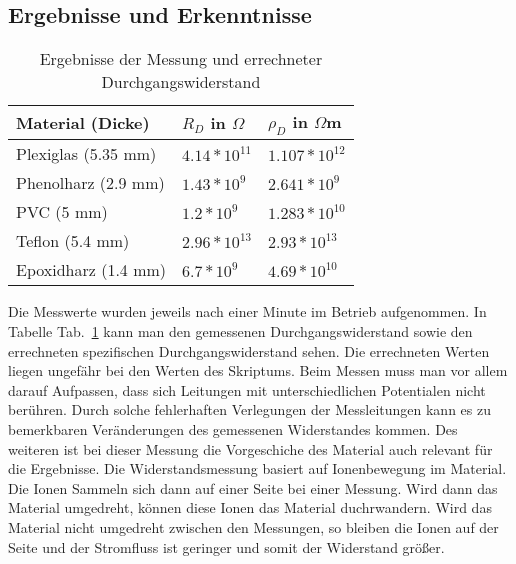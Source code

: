 \documentclass[a4paper,twoside,12pt,DIV=13,BCOR=5mm,numbers=noenddot,cleardoublepage=empty]{scrbook}
\begin{document}
            \subsection{Ergebnisse und Erkenntnisse}
            \begin{table}[h]
                \begin{center}
                    \begin{tabular}{|l||l|l|}
                        \hline
                        Material (Dicke) & $R_D$ in $\Omega$ & $\rho_D$ in $\Omega$m \\
                        \hline
                        \hline
                        Plexiglas (5.35 mm) & $4.14*10^{11}$ & $1.107*10^{12}$ \\
                        \hline
                        Phenolharz (2.9 mm) & $1.43*10^{9}$ & $2.641*10^{9}$ \\
                        \hline
                        PVC (5 mm) & $1.2*10^{9}$ & $1.283*10^{10}$ \\
                        \hline
                        Teflon (5.4 mm) & $2.96*10^{13}$ & $2.93*10^{13}$ \\
                        \hline
                        Epoxidharz (1.4 mm) & $6.7*10^{9}$ & $4.69*10^{10}$ \\
                        \hline
                    \end{tabular}
                    \caption{Ergebnisse der Messung und errechneter Durchgangswiderstand}
                    \label{tab:table1}
                \end{center}
            \end{table}
            Die Messwerte wurden jeweils nach einer Minute im Betrieb aufgenommen. In Tabelle
            Tab.~\ref{tab:table1} kann man den gemessenen Durchgangswiderstand sowie den errechneten spezifischen
            Durchgangswiderstand sehen. Die errechneten Werten liegen ungefähr bei den Werten des Skriptums.
            Beim Messen muss man vor allem darauf Aufpassen, dass sich Leitungen mit 
            unterschiedlichen Potentialen nicht ber\"uhren. Durch solche fehlerhaften Verlegungen
            der Messleitungen kann es zu bemerkbaren Ver\"anderungen des gemessenen Widerstandes
            kommen. Des weiteren ist bei dieser Messung die Vorgeschiche des Material auch relevant für die
            Ergebnisse. Die Widerstandsmessung basiert auf Ionenbewegung im Material. Die Ionen Sammeln sich
            dann auf einer Seite bei einer Messung. Wird dann das Material umgedreht, können diese Ionen das 
            Material duchrwandern. Wird das Material nicht umgedreht zwischen den Messungen, so bleiben die Ionen
            auf der Seite und der Stromfluss ist geringer und somit der Widerstand grö\ss{}er.
\end{document}
